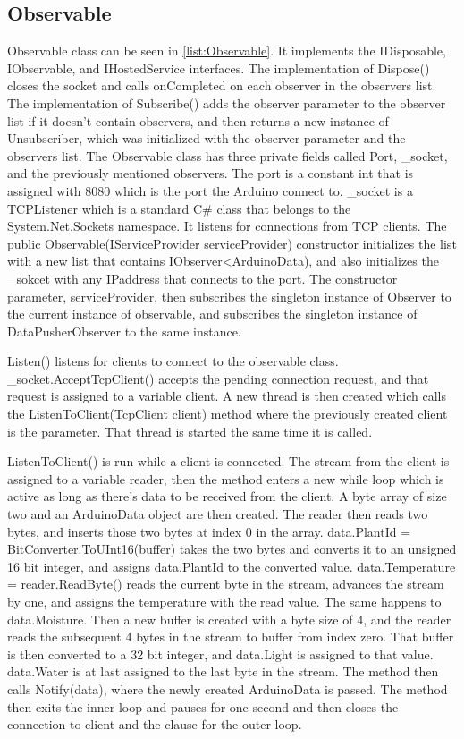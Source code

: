 \documentclass[a4paper,12pt,oneside,openright,titlepage]{book}
\begin{document}
\subsection{Observable}
Observable class can be seen in \ref{list:Observable}. It implements the IDisposable, IObservable, and IHostedService interfaces. The implementation of Dispose() closes the socket and calls onCompleted on each observer in the observers list. The implementation of Subscribe() adds the observer parameter to the observer list if it doesn't contain observers, and then returns a new instance of Unsubscriber, which was initialized with the observer parameter and the observers list. The Observable class has three private fields called Port, \_socket, and the previously mentioned observers. The port is a constant int that is assigned with 8080 which is the port the Arduino connect to. \_socket is a TCPListener which is a standard C\# class that belongs to the System.Net.Sockets namespace. It listens for connections from TCP clients. The public Observable(IServiceProvider serviceProvider) constructor initializes the list with a new list that contains IObserver<ArduinoData), and also initializes the \_sokcet with any IPaddress that connects to the port. The constructor parameter, serviceProvider, then subscribes the singleton instance of Observer to the current instance of observable, and subscribes the singleton instance of DataPusherObserver to the same instance.

Listen() listens for clients to connect to the observable class. \_socket.AcceptTcpClient() accepts the pending connection request, and that request is assigned to a variable client. A new thread is then created which calls the ListenToClient(TcpClient client) method where the previously created client is the parameter. That thread is started the same time it is called.

ListenToClient() is run while a client is connected. The stream from the client is assigned to a variable reader, then the method enters a new while loop which is active as long as there's data to be received from the client. A byte array of size two and an ArduinoData object are then created. The reader then reads two bytes, and inserts those two bytes at index 0 in the array. data.PlantId = BitConverter.ToUInt16(buffer) takes the two bytes and converts it to an unsigned 16 bit integer, and assigns data.PlantId to the converted value. data.Temperature = reader.ReadByte() reads the current byte in the stream, advances the stream by one, and assigns the temperature with the read value. The same happens to data.Moisture. Then a new buffer is created with a byte size of 4, and the reader reads the subsequent 4 bytes in the stream to buffer from index zero. That buffer is then converted to a 32 bit integer, and data.Light is assigned to that value. data.Water is at last assigned to the last byte in the stream. The method then calls Notify(data), where the newly created ArduinoData is passed. The method then exits the inner loop and pauses for one second and then closes the connection to client and the clause for the outer loop.
\end{document}

